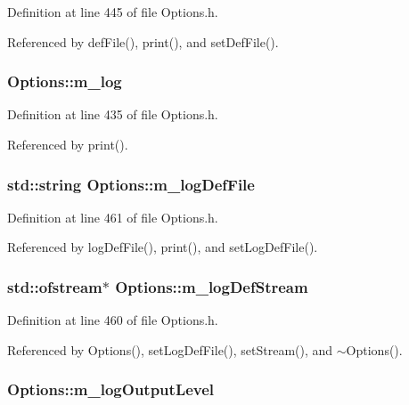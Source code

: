 Definition at line 445 of file Options.h.

Referenced by defFile(), print(), and setDefFile().\hypertarget{classOptions_a80d2caed71dd935c104f0133504251e9}{
\subsubsection[{m\_\-log}]{ {\bf Options::m\_\-log}}}
\label{classOptions_a80d2caed71dd935c104f0133504251e9}


Definition at line 435 of file Options.h.

Referenced by print().\hypertarget{classOptions_abaef6cdcc8422b199084510d173edbe6}{
\subsubsection[{m\_\-logDefFile}]{\setlength{\rightskip}{0pt plus 5cm}std::string {\bf Options::m\_\-logDefFile}}}
\label{classOptions_abaef6cdcc8422b199084510d173edbe6}


Definition at line 461 of file Options.h.

Referenced by logDefFile(), print(), and setLogDefFile().\hypertarget{classOptions_aebb2db3fb07ea1f73b27bde841be69d8}{
\subsubsection[{m\_\-logDefStream}]{\setlength{\rightskip}{0pt plus 5cm}std::ofstream$\ast$ {\bf Options::m\_\-logDefStream}}}
\label{classOptions_aebb2db3fb07ea1f73b27bde841be69d8}


Definition at line 460 of file Options.h.

Referenced by Options(), setLogDefFile(), setStream(), and $\sim$Options().\hypertarget{classOptions_a9ecfefe6bf44ff519369f38eb5c8147a}{
\subsubsection[{m\_\-logOutputLevel}]{ {\bf Options::m\_\-logOutputLevel}}}
\label{classOptions_a9ecfefe6bf44ff519369f38eb5c8147a}


